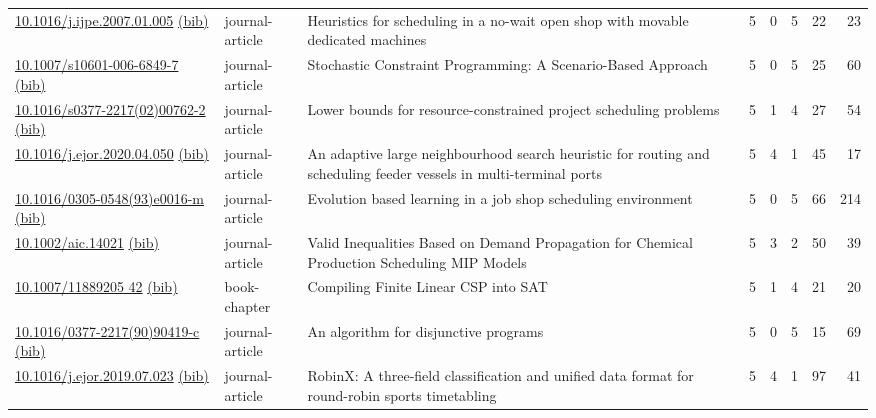 {\begin{longtable}{p{5cm}lp{11cm}rrrrr}
\href{http://dx.doi.org/10.1016/j.ijpe.2007.01.005}{10.1016/j.ijpe.2007.01.005} \href{https://www.doi2bib.org/bib/10.1016/j.ijpe.2007.01.005}{(bib)} & journal-article & Heuristics for scheduling in a no-wait open shop with movable dedicated machines & 5 & 0 & 5 & 22 & 23 \\
\href{http://dx.doi.org/10.1007/s10601-006-6849-7}{10.1007/s10601-006-6849-7} \href{https://www.doi2bib.org/bib/10.1007/s10601-006-6849-7}{(bib)} & journal-article & Stochastic Constraint Programming: A Scenario-Based Approach & 5 & 0 & 5 & 25 & 60 \\
\href{http://dx.doi.org/10.1016/s0377-2217(02)00762-2}{10.1016/s0377-2217(02)00762-2} \href{https://www.doi2bib.org/bib/10.1016/s0377-2217(02)00762-2}{(bib)} & journal-article & Lower bounds for resource-constrained project scheduling problems & 5 & 1 & 4 & 27 & 54 \\
\href{http://dx.doi.org/10.1016/j.ejor.2020.04.050}{10.1016/j.ejor.2020.04.050} \href{https://www.doi2bib.org/bib/10.1016/j.ejor.2020.04.050}{(bib)} & journal-article & An adaptive large neighbourhood search heuristic for routing and scheduling feeder vessels in multi-terminal ports & 5 & 4 & 1 & 45 & 17 \\
\href{http://dx.doi.org/10.1016/0305-0548(93)e0016-m}{10.1016/0305-0548(93)e0016-m} \href{https://www.doi2bib.org/bib/10.1016/0305-0548(93)e0016-m}{(bib)} & journal-article & Evolution based learning in a job shop scheduling environment & 5 & 0 & 5 & 66 & 214 \\
\href{http://dx.doi.org/10.1002/aic.14021}{10.1002/aic.14021} \href{https://www.doi2bib.org/bib/10.1002/aic.14021}{(bib)} & journal-article & Valid Inequalities Based on Demand Propagation for Chemical Production Scheduling MIP Models & 5 & 3 & 2 & 50 & 39 \\
\href{http://dx.doi.org/10.1007/11889205_42}{10.1007/11889205 42} \href{https://www.doi2bib.org/bib/10.1007/11889205_42}{(bib)} & book-chapter & Compiling Finite Linear CSP into SAT & 5 & 1 & 4 & 21 & 20 \\
\href{http://dx.doi.org/10.1016/0377-2217(90)90419-c}{10.1016/0377-2217(90)90419-c} \href{https://www.doi2bib.org/bib/10.1016/0377-2217(90)90419-c}{(bib)} & journal-article & An algorithm for disjunctive programs & 5 & 0 & 5 & 15 & 69 \\
\href{http://dx.doi.org/10.1016/j.ejor.2019.07.023}{10.1016/j.ejor.2019.07.023} \href{https://www.doi2bib.org/bib/10.1016/j.ejor.2019.07.023}{(bib)} & journal-article & RobinX: A three-field classification and unified data format for round-robin sports timetabling & 5 & 4 & 1 & 97 & 41 \\

\end{longtable}}
